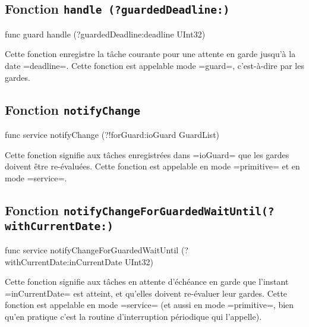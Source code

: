 \subsection{Fonction \texttt{handle (?guardedDeadline{}:)}}

\begin{PLM}
func guard handle (?guardedDeadline:deadline UInt32)
\end{PLM}

Cette fonction enregistre la tâche courante pour une attente en garde jusqu'à la date \plm=deadline=. Cette fonction est appelable mode \plm=guard=, c'est-à-dire par les gardes.










\subsection{Fonction \texttt{notifyChange}}

\begin{PLM}
func service notifyChange (?!forGuard:ioGuard GuardList)
\end{PLM}

Cette fonction signifie aux tâches enregistrées dans \plm=ioGuard= que les gardes doivent être re-évaluées. Cette fonction est appelable en mode \plm=primitive= et en mode \plm=service=.











\subsection{Fonction \texttt{notifyChangeForGuardedWaitUntil(?withCurrentDate{}:)}}

\begin{PLM}
func service
notifyChangeForGuardedWaitUntil (?withCurrentDate:inCurrentDate UInt32)
\end{PLM}

Cette fonction signifie aux tâches en attente d'échéance en garde que l'instant \plm=inCurrentDate= est atteint, et qu'elles doivent re-évaluer leur gardes. Cette fonction est appelable en mode \plm=service= (et aussi en mode \plm=primitive=, bien qu'en pratique c'est la routine d'interruption périodique qui l'appelle).



